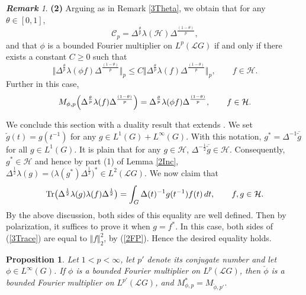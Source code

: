 \documentclass[12pt]{amsart}
\renewcommand{\H}{\mbox{${\mathcal H}$}}
\newcommand{\norm}[1]{\Vert#1\Vert}
\newcommand{\bignorm}[1]{\bigl\Vert#1\bigr\Vert}
\newtheorem{proposition}[theorem]{Proposition}
\theoremstyle{remark}
\newtheorem{remark}[theorem]{\bf Remark}
\theoremstyle{definition}
\numberwithin{equation}{section}
\begin{document}
\begin{remark}
\smallskip
{\bf (2)}   Arguing as in Remark \ref{3Theta}, we obtain that for any 
$\theta\in[0,1]$, 
$$
{\mathcal C}_p = \Delta^{\frac{\theta}{p}}\lambda(\H) \Delta^{\frac{(1-\theta)}{p}},
$$
and that $\phi$ is a bounded Fourier multiplier 
on $L^p({\mathcal L}G)$ if and only if there exists a constant $C\geq 0$ such that
$$
\bignorm{\Delta^{\frac{\theta}{p}}\lambda(\phi f)\Delta^{\frac{(1-\theta)}{p}}}_p\leq C
\bignorm{\Delta^{\frac{\theta}{p}}\lambda(f)\Delta^{\frac{(1-\theta)}{p}}}_p,\qquad f\in\H.
$$
Further in this case,
$$
M_{\phi,p}\Bigl(\Delta^{\frac{\theta}{p}} \lambda(f) \Delta^{\frac{(1-\theta)}{p}}\Bigr)
= \Delta^{\frac{\theta}{p}} \lambda(\phi f) \Delta^{\frac{(1-\theta)}{p}},
\qquad f\in\H.
$$
\end{remark}





We conclude this section with a duality result that extends \cite[Lemma 6.4]{AK}.
We set $\check{g}(t)=g(t^{-1})$ for any $g\in L^1(G)+L^\infty(G)$. With this notation,
$g^*=\Delta^{-1}\overline{\check{g}}$ for all $g\in L^1(G)$. 
It is plain that for any $g\in\H$, $\Delta^{-\frac12}\overline{\check{g}}\in\H$.
Consequently, $g^*\in\H$ and hence by part (1) of Lemma \ref{2Inc},
$\Delta^{\frac12}\lambda(g) = \bigl(\lambda(g^*)\Delta^\frac12\bigr)^*\in L^2({\mathcal L}G)$. We now claim that
\begin{equation}\label{3Trace}
{\rm Tr}\bigl(\Delta^\frac12\lambda(g)\lambda(f)\Delta^\frac12\bigr) = \int_G\Delta(t)^{-1} g(t^{-1})f(t)\, dt,\qquad
f,g\in \H.
\end{equation}
By the above discussion, both sides of this equality are well defined.
Then by polarization, it suffices to prove it when $g=f^*$. In this case,
both sides of (\ref{3Trace}) are equal to $\norm{f}_2^2$, by (\ref{2FP}). Hence
the desired equality holds.




\begin{proposition}\label{3Duality} 
Let $1<p<\infty$, let $p'$ denote its conjugate number and let $\phi\in L^\infty(G)$. If $\phi$
is a bounded Fourier multiplier on $L^p({\mathcal L}G)$, 
then $\check{\phi}$ is a bounded Fourier multiplier on $L^{p'}({\mathcal L}G)$,
and 
$
M_{\phi,p}^*= M_{\check{\phi},p'}.
$
\end{proposition}
\end{document}
